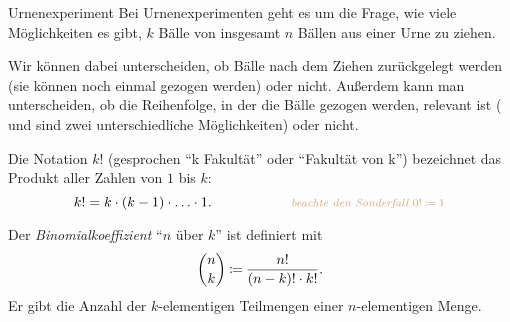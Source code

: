 \documentclass[../../main.tex]{subfiles}
\begin{document}
    \begin{nutshell}{Urnenexperiment}
        Bei Urnenexperimenten geht es um die Frage, wie viele Möglichkeiten es gibt, $k$ Bälle von insgesamt $n$ Bällen aus einer Urne zu ziehen.
        
        Wir können dabei unterscheiden, ob Bälle nach dem Ziehen zurückgelegt werden (sie können noch einmal gezogen werden) oder nicht. Außerdem kann man unterscheiden, ob die Reihenfolge, in der die Bälle gezogen werden, relevant ist (\redball\blueball{} und \blueball\redball{} sind zwei unterschiedliche Möglichkeiten) oder nicht.
        \begin{center}
        \end{center}
        
        Die Notation $k!$ (gesprochen \enquote{k Fakultät} oder \enquote{Fakultät von k}) bezeichnet das Produkt aller Zahlen von $1$ bis $k$:
        \[k! = k \cdot (k-1) \cdot \ldots \cdot 1. \hspace{2cm}\text{\footnotesize\textcolor{brown!70}{\emph{beachte den Sonderfall $0! \defas 1$}}}\]
        
        Der \emph{Binomialkoeffizient} \enquote{$n$ über $k$} ist definiert mit
        \[\binom{n}{k} \mathbin{\coloneqq} \frac{n!}{(n-k)!\cdot k!}.\]
        Er gibt die Anzahl der $k$-elementigen Teilmengen einer $n$-elementigen Menge.
    \end{nutshell}
\end{document}
